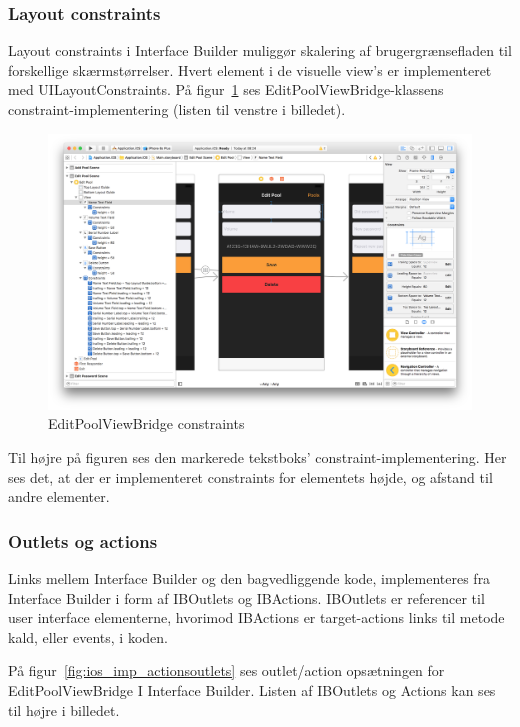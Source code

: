 \subsubsection{Layout constraints}
Layout constraints i Interface Builder muliggør skalering af brugergrænsefladen til forskellige skærmstørrelser. Hvert element i de visuelle view's er implementeret med UILayoutConstraints. På figur~\ref{fig:ios_imp_constraints} ses EditPoolViewBridge-klassens constraint-implementering (listen til venstre i billedet).

\begin{figure}
	\centering
	\includegraphics[width=1.0\linewidth]{figs/implementering/ios_imp_constraints}
	\caption{EditPoolViewBridge constraints}
	\label{fig:ios_imp_constraints}
\end{figure}

Til højre på figuren ses den markerede tekstboks' constraint-implementering. Her ses det, at der er implementeret constraints for elementets højde, og afstand til andre elementer.

\subsubsection{Outlets og actions}
Links mellem Interface Builder og den bagvedliggende kode, implementeres fra Interface Builder i form af IBOutlets og IBActions. IBOutlets er referencer til user interface elementerne, hvorimod IBActions er target-actions links til metode kald, eller events, i koden.

På figur~\ref{fig:ios_imp_actionsoutlets} ses outlet/action opsætningen for EditPoolViewBridge I Interface Builder. Listen af IBOutlets og Actions kan ses til højre i billedet.

